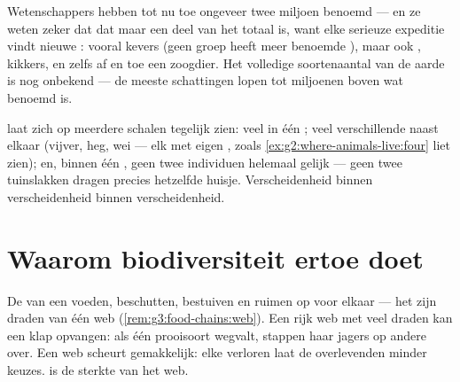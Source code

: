 \begin{example}\label{ex:g5:biodiversity:planet}
Wetenschappers hebben tot nu toe ongeveer twee miljoen  benoemd
--- en ze weten zeker dat dat maar een deel van het totaal is, want elke
serieuze expeditie vindt nieuwe : vooral kevers (geen groep heeft
meer benoemde ), maar ook , kikkers,  en zelfs af en
toe een zoogdier. Het volledige soortenaantal van de aarde is nog
onbekend --- de meeste schattingen lopen tot miljoenen boven wat benoemd is.
\end{example}

\begin{remark}\label{rem:g5:biodiversity:scales}
 laat zich op meerdere schalen tegelijk zien: veel 
in één ; veel verschillende  naast elkaar (vijver,
heg, wei --- elk met eigen , zoals
\cref{ex:g2:where-animals-live:four} liet zien); en, binnen één ,
geen twee individuen helemaal gelijk --- geen twee tuinslakken dragen
precies hetzelfde huisje. Verscheidenheid binnen verscheidenheid binnen
verscheidenheid.
\end{remark}

\section{Waarom biodiversiteit ertoe doet}

\begin{proposition}\label{prop:g5:biodiversity:web}
De  van een  voeden, beschutten, bestuiven en ruimen op
voor elkaar --- het zijn draden van één web
(\cref{rem:g3:food-chains:web}). Een rijk web met veel draden kan een
klap opvangen: als één prooisoort wegvalt, stappen haar jagers op andere
over. Een  web scheurt gemakkelijk: elke verloren  laat de
overlevenden minder keuzes.  is de sterkte van het web.
\end{proposition}
\admitted

